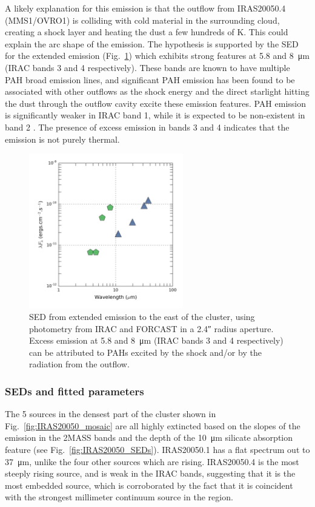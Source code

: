 A likely explanation for this emission is that the outflow from IRAS20050.4 (MMS1/OVRO1) is colliding with cold material in the surrounding cloud, creating a shock layer and heating the dust a few hundreds of K. This could explain the arc shape of the emission. The hypothesis is supported by the SED for the extended emission (Fig.~\ref{fig:IRAS20050_ext_SED}) which exhibits strong features at 5.8 and \SI{8}{\um} (IRAC bands 3 and 4 respectively). These bands are known to have multiple PAH broad emission lines, and significant PAH emission has been found to be associated with other outflows \citep{NoriegaCrespo:2004fe,Hudgins:2004wa} as the shock energy and the direct starlight hitting the dust through the outflow cavity excite these emission features. PAH emission is significantly weaker in IRAC band 1, while it is expected to be non-existent in band 2 \citep{NoriegaCrespo:2004fe}. The presence of excess emission in bands 3 and 4 indicates that the emission is not purely thermal.


\begin{figure}[!h]
\begin{center}
\includegraphics[width=0.6\textwidth]{Figures/IRAS20050_extended.jpg}
\caption[IRAS20050+2720 extended emission SED]{SED from extended emission to the east of the cluster, using photometry from IRAC and FORCAST in a \ang{;;2.4} radius aperture. Excess emission at 5.8 and \SI{8}{\um} (IRAC bands 3 and 4 respectively) can be attributed to PAHs excited by the shock and/or by the radiation from the outflow.}
\label{fig:IRAS20050_ext_SED}
\end{center}
\end{figure}




\subsubsection{SEDs and fitted parameters}
The 5 sources in the densest part of the cluster shown in Fig.~\ref{fig:IRAS20050_mosaic} are all highly extincted based on the slopes of the emission in the 2MASS bands and the depth of the \SI{10}{\um} silicate absorption feature (see Fig.~\ref{fig:IRAS20050_SEDs}). IRAS20050.1 has a flat spectrum out to \SI{37}{\um}, unlike the four other sources which are rising. IRAS20050.4 is the most steeply rising source, and is weak in the IRAC bands, suggesting that it is the most embedded source, which is corroborated by the fact that it is coincident with the strongest millimeter continuum source in the region. 

